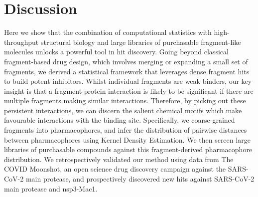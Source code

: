 \section{Discussion} \label{sec:fresco_discussion}

Here we show that the combination of computational statistics with high-throughput structural biology and large libraries of purchasable fragment-like molecules unlocks a powerful tool in hit discovery. Going beyond classical fragment-based drug design, which involves merging or expanding a small set of fragments, we derived a statistical framework that leverages dense fragment hits to build potent inhibitors. Whilst individual fragments are weak binders, our key insight is that a fragment-protein interaction is likely to be significant if there are multiple fragments making similar interactions. Therefore, by picking out these persistent interactions, we can discern the salient chemical motifs which make favourable interactions with the binding site. Specifically, we coarse-grained fragments into pharmacophores, and infer the distribution of pairwise distances between pharmacophores using Kernel Density Estimation. We then screen large libraries of purchasable compounds against this fragment-derived pharmacophore distribution. We retrospectively validated our method using data from The COVID Moonshot, an open science drug discovery campaign against the SARS-CoV-2 main protease, and prospectively discovered new hits against SARS-CoV-2 main protease and nsp3-Mac1.


